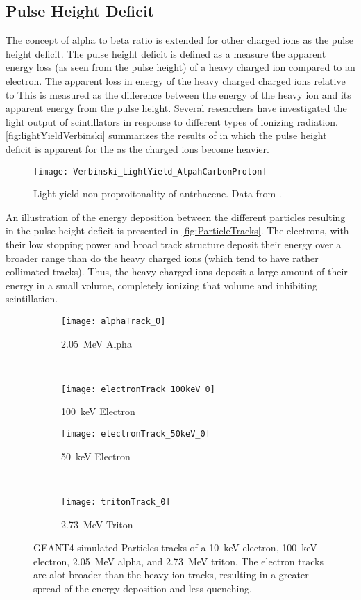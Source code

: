 \subsection{Pulse Height Deficit}
The concept of alpha to beta ratio is extended for other charged ions as the pulse height deficit.
The pulse height deficit is defined as a measure the apparent energy loss (as seen from the pulse height) of a heavy charged ion compared to an electron.  
The apparent loss in energy of the heavy charged charged ions relative to
This is measured as the difference between the energy of the heavy ion and its apparent energy from the pulse height.  
Several researchers have investigated the light output of scintillators in response to different types of ionizing radiation.
\autoref{fig:lightYieldVerbinski} summarizes the results of \cite{Verbinski_1968} in which the pulse height deficit is apparent for the as the charged ions become heavier.
\begin{figure}
  \centering
  \texttt{[image: Verbinski\_LightYield\_AlpahCarbonProton]}
  \caption[Light yield non-proporitonality of anthracene]{Light yield non-proproitonality of antrhacene. Data from \cite{Verbinski_1968}.}
  \label{fig:lightYieldVerbinski}
\end{figure}

An illustration of the energy deposition between the different particles resulting in the pulse height deficit is presented in \autoref{fig:ParticleTracks}.
The electrons, with their low stopping power and broad track structure deposit their energy over a broader range than do the heavy charged ions (which tend to have rather collimated tracks).
Thus, the heavy charged ions deposit a large amount of their energy in a small volume, completely ionizing that volume and inhibiting scintillation.
\begin{figure}
  \begin{subfigure}[b]{0.45\textwidth}
    \texttt{[image: alphaTrack\_0]}
    \caption{\SI{2.05}{\MeV} Alpha}
  \end{subfigure}%
  ~
  \begin{subfigure}[b]{0.45\textwidth}
    \texttt{[image: electronTrack\_100keV\_0]}
    \caption{\SI{100}{\keV} Electron}
  \end{subfigure}
  
  \begin{subfigure}[b]{0.45\textwidth}
    \texttt{[image: electronTrack\_50keV\_0]}
    \caption{\SI{50}{\keV} Electron}
  \end{subfigure}%
  ~
  \begin{subfigure}[b]{0.45\textwidth}
    \texttt{[image: tritonTrack\_0]}
    \caption{\SI{2.73}{\MeV} Triton}
  \end{subfigure}
  \caption[Particle Tracks of Alpha, Triton and Electrons]{GEANT4 simulated Particles tracks of a \SI{10}{\keV} electron, \SI{100}{\keV} electron, \SI{2.05}{\MeV} alpha, and \SI{2.73}{\MeV} triton.  The electron tracks are alot broader than the heavy ion tracks, resulting in a greater spread of the energy deposition and less quenching.}
  \label{fig:ParticleTracks}
\end{figure}

